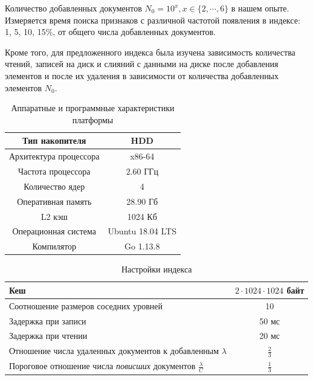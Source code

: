 Количество добавленных документов $N_0 = 10^{x}, x \in \{2, \cdots, 6\}$ в нашем опыте.
Измеряется время поиска признаков с различной частотой появления в индексе: 1,
5, 10, 15\%, от общего числа добавленных документов.


Кроме того, для предложенного индекса была изучена зависимость количества чтений,
записей на диск и слияний с данными на диске после добавления элементов и после
их удаления в зависимости от количества добавленных элементов $N_0$.

\begin{table}[H]
\caption{Аппаратные и программные характеристики платформы}
\centering
\small
\singlespacing
\begin{tabular}{|c|c|}
      \hline
      Тип накопителя         & HDD              \\ \hline
      Архитектура процессора & x86-64           \\ \hline
      Частота процессора     & $2.60$ ГГц       \\ \hline
      Количество ядер        & 4                \\ \hline
      Оперативная память     & 28.90 Гб         \\ \hline
      L2 кэш                 & 1024 Кб          \\ \hline
      Операционная система   & Ubuntu 18.04 LTS \\ \hline
      Компилятор             & Go 1.13.8        \\ \hline
\end{tabular}
\label{tab:arch_settings}
\end{table}

\begin{table}[H]
      \caption{Настройки индекса}
      \centering
      \small
      \singlespacing
      \begin{tabular}{|l|c|}
            \hline
            Кеш                                                                           & $2\cdot 1024\cdot 1024$ байт \\ \hline
            Соотношение размеров соседних уровней                                         & 10               \\ \hline
            Задержка при записи                                                           & 50 мс            \\ \hline
            Задержка при чтении                                                           & 20 мс            \\ \hline
            Отношение числа удаленных документов к добавленным $\lambda$                  & $\frac{2}{3}$    \\ \hline
            Пороговое отношение числа \textit{повисших} документов $\frac{\lambda}{C}$    & $\frac{1}{3}$    \\ \hline
\end{tabular}
\label{tab:lsm_settings}
\end{table}

